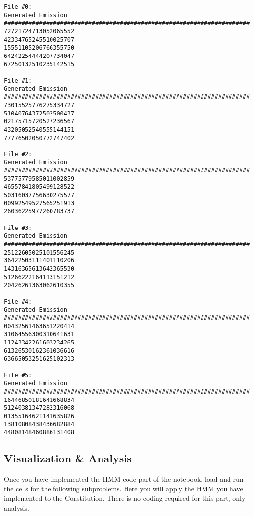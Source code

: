 \begin{solution}
\begin{verbatim}
File #0:
Generated Emission            
######################################################################
72721724713052065552          
42334765245510025707          
15551105206766355750          
64242254444207734047          
67250132510235142515          

File #1:
Generated Emission            
######################################################################
73015525776275334727          
51040764372502500437          
02175715720527236567          
43205052540555144151          
77776502050772747402          

File #2:
Generated Emission            
######################################################################
53775779585011002859          
46557841805499128522          
50316037756630275577          
00992549527565251913          
26036225977260783737          

File #3:
Generated Emission            
######################################################################
25122605025101556245          
36422503111401110206          
14316365613642365530          
51266222164113151212          
20426261363062610355          

File #4:
Generated Emission            
######################################################################
00432561463651220414          
31064556300310641631          
11243342261603234265          
61326530162361036616          
63665053251625102313          

File #5:
Generated Emission            
######################################################################
16446850181641668834          
51240381347282316068          
01355164621141635826          
13810808438436682884          
44808148460886131408
\end{verbatim}
\end{solution}

\newpage

\subsection{Visualization \& Analysis}

Once you have implemented the HMM code part of the notebook, load and run the cells for the following subproblems. Here you will apply the HMM you have implemented to the Constitution. There is no coding required for this part, only analysis.

